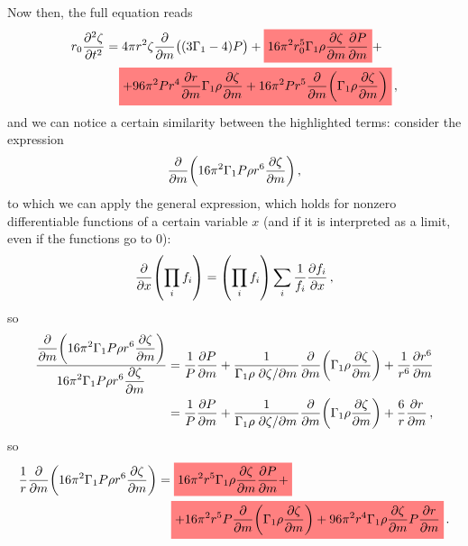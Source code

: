 \documentclass[main.tex]{subfiles}
\begin{document}
Now then, the full equation reads 
%
\begin{subequations}
\begin{align}
\begin{split}
r_0 \pdv[2]{\zeta }{t} &= 
4 \pi r^2 \zeta \pdv{}{m} \qty((3\Gamma_1 -4) P) 
+ \hlc{red}{16 \pi^2 r_0^5 \Gamma_1 \rho \pdv{\zeta }{m} \pdv{P}{m}} + \\
&\phantom{=}\ 
\hlc{red}{+ 96 \pi^2 P r^4 \pdv{r}{m} \Gamma_1 \rho \pdv{\zeta }{m}
+ 16 \pi^2 P r^5 \pdv{}{m} \qty(\Gamma_1 \rho \pdv{\zeta }{m})}
\,,
\end{split}
\end{align}
\end{subequations}
%
and we can notice a certain similarity between the highlighted terms: consider the expression 
%
\begin{align}
\pdv{}{m} \qty(16 \pi^2 \Gamma_1 P \rho r^{6} \pdv{\zeta }{m})
\,,
\end{align}
to which we can apply the general expression, which holds for nonzero differentiable functions of a certain variable \(x\) (and if it is interpreted as a limit, even if the functions go to 0): 
%
\begin{align}
\pdv{}{x} \qty(\prod_i f_i) 
= \qty(\prod_i f_i) \sum_i \frac{1}{f_i} \pdv{f_i}{x}
\,,
\end{align}
%
so 
%
\begin{subequations}
\begin{align}
\frac{\displaystyle\pdv{}{m} \qty(16 \pi^2 \Gamma_1 P \rho r^{6} \pdv{\zeta }{m})}{\displaystyle 16 \pi^2 \Gamma_1 P \rho r^{6} \pdv{\zeta }{m}} &= 
\frac{1}{P} \pdv{P}{m} 
+ \frac{1}{\Gamma_1 \rho \pdv*{\zeta }{m}} \pdv{}{m} \qty(\Gamma_1 \rho \pdv{\zeta }{m})
+ \frac{1}{r^{6}} \pdv{r^{6}}{m}  \\
&= \frac{1}{P} \pdv{P}{m} 
+ \frac{1}{\Gamma_1 \rho \pdv*{\zeta }{m}} \pdv{}{m} \qty(\Gamma_1 \rho \pdv{\zeta }{m})
+ \frac{6}{r} \pdv{r}{m} 
\,,
\end{align}
\end{subequations}
%
so 
%
\begin{subequations}
\begin{align}
\begin{split}
\frac{1}{r} \pdv{}{m} \qty(16 \pi^2 \Gamma_1 P \rho r^{6} \pdv{\zeta }{m}) &= 
\hlc{red}{16 \pi^2 r^{5} \Gamma_1 \rho \pdv{\zeta }{m} \pdv{P}{m} +} \\
&\phantom{=}\ 
\hlc{red}{+ 16 \pi^2 r^{5} P \pdv{}{m} \qty(\Gamma_1 \rho \pdv{\zeta }{m}) + 96 \pi^2r^{4} \Gamma_1 \rho \pdv{\zeta }{m} P \pdv{r}{m}}
\,.
\end{split}
\end{align}
\end{subequations}
\end{document}
